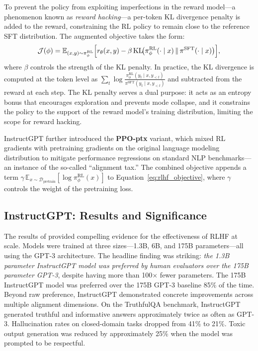 To prevent the policy from exploiting imperfections in the reward model---a phenomenon known as \emph{reward hacking}---a per-token KL divergence penalty is added to the reward, constraining the RL policy to remain close to the reference SFT distribution. The augmented objective takes the form:
\begin{equation}
    \mathcal{J}(\phi) = \mathbb{E}_{(x, y) \sim \pi_\phi^{\text{RL}}} \Bigl[r_\theta(x, y) - \beta \, \text{KL}\!\bigl(\pi_\phi^{\text{RL}}(\cdot \mid x) \,\|\, \pi^{\text{SFT}}(\cdot \mid x)\bigr)\Bigr],
    \label{eq:rlhf_objective}
\end{equation}
where $\beta$ controls the strength of the KL penalty. In practice, the KL divergence is computed at the token level as $\sum_t \log \frac{\pi_\phi^{\text{RL}}(y_t \mid x, y_{<t})}{\pi^{\text{SFT}}(y_t \mid x, y_{<t})}$ and subtracted from the reward at each step. The KL penalty serves a dual purpose: it acts as an entropy bonus that encourages exploration and prevents mode collapse, and it constrains the policy to the support of the reward model's training distribution, limiting the scope for reward hacking.

InstructGPT further introduced the \textbf{PPO-ptx} variant, which mixed RL gradients with pretraining gradients on the original language modeling distribution to mitigate performance regressions on standard NLP benchmarks---an instance of the so-called ``alignment tax.'' The combined objective appends a term $\gamma \, \mathbb{E}_{x \sim \mathcal{D}_{\text{pretrain}}}[\log \pi_\phi^{\text{RL}}(x)]$ to Equation~\ref{eq:rlhf_objective}, where $\gamma$ controls the weight of the pretraining loss.

\subsection{InstructGPT: Results and Significance}

The results of \cite{ouyang2022instructgpt} provided compelling evidence for the effectiveness of RLHF at scale. Models were trained at three sizes---1.3B, 6B, and 175B parameters---all using the GPT-3 architecture. The headline finding was striking: \emph{the 1.3B parameter InstructGPT model was preferred by human evaluators over the 175B parameter GPT-3}, despite having more than 100$\times$ fewer parameters. The 175B InstructGPT model was preferred over the 175B GPT-3 baseline 85\% of the time. Beyond raw preference, InstructGPT demonstrated concrete improvements across multiple alignment dimensions. On the TruthfulQA benchmark, InstructGPT generated truthful and informative answers approximately twice as often as GPT-3. Hallucination rates on closed-domain tasks dropped from 41\% to 21\%. Toxic output generation was reduced by approximately 25\% when the model was prompted to be respectful.


